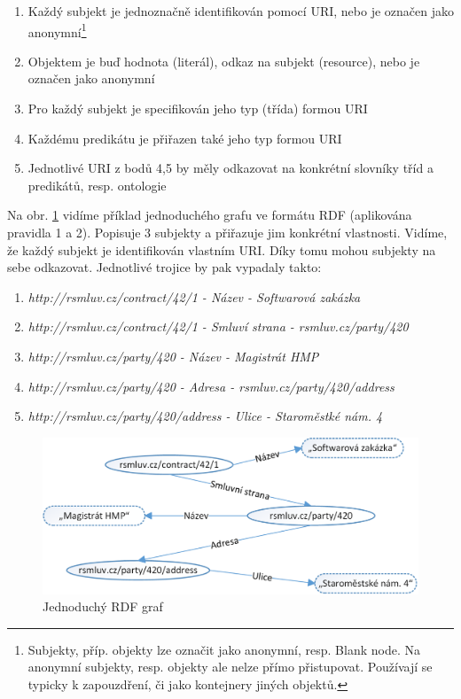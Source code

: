 \begin{enumerate}
\item Každý subjekt je jednoznačně identifikován pomocí URI, nebo je označen jako anonymní\footnote{Subjekty, příp. objekty lze označit jako anonymní, resp. Blank node. Na anonymní subjekty, resp. objekty ale nelze přímo přistupovat. Používají se typicky k zapouzdření, či jako kontejnery jiných objektů.} 
\item Objektem je buď hodnota (literál), odkaz na subjekt (resource), nebo je označen jako anonymní
\item Pro každý subjekt je specifikován jeho typ (třída) formou URI
\item Každému predikátu je přiřazen také jeho typ formou URI
\item Jednotlivé URI z bodů 4,5 by měly odkazovat na konkrétní slovníky tříd a predikátů, resp. ontologie
\end{enumerate}

Na obr. \ref{obr:rdf_graph} vidíme příklad jednoduchého grafu ve formátu RDF (aplikována pravidla 1 a 2). Popisuje 3 subjekty a přiřazuje jim konkrétní vlastnosti. Vidíme, že každý subjekt je identifikován vlastním URI. Díky tomu mohou subjekty na sebe odkazovat. Jednotlivé trojice by pak vypadaly takto:

\begin{enumerate}
\item \textit{http://rsmluv.cz/contract/42/1 - Název - Softwarová zakázka}   
\item \textit{http://rsmluv.cz/contract/42/1 - Smluví strana - rsmluv.cz/party/420}
\item \textit{http://rsmluv.cz/party/420 - Název - Magistrát HMP}
\item \textit{http://rsmluv.cz/party/420 - Adresa - rsmluv.cz/party/420/address}
\item \textit{http://rsmluv.cz/party/420/address - Ulice - Staroměstké nám. 4}
\end{enumerate}

\begin{figure}[h]
\centerline{\includegraphics[width=\textwidth]{img/rdf_graph.eps}}
\caption{Jednoduchý RDF graf}
\label{obr:rdf_graph}
\end{figure}


